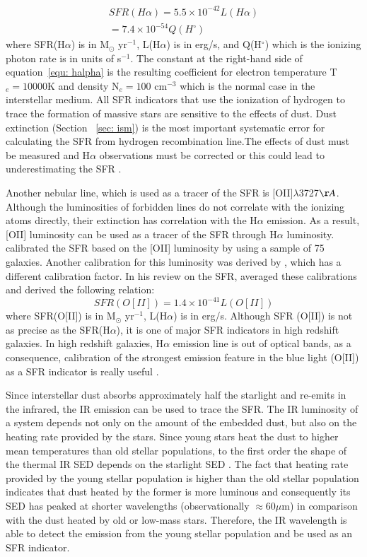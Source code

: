 \begin{align}
\label{equ: halpha}
SFR(H\alpha) = 5.5 \times 10^{-42}L(H\alpha) \\
                     = 7.4 \times 10^{-54}Q(H^{\circ})
\end{align}
where SFR(H$\alpha$) is in M$_{\odot}$ yr$^{-1}$, L(H$\alpha$) is in erg/s, and Q(H$^{\circ}$) which is the ionizing photon rate is in units of s$^{-1}$. The constant at the right-hand side of equation~\ref{equ: halpha} is the resulting coefficient for electron temperature T$_e=10000$K and density N$_e=100$ cm$^{-3}$ which is the normal case in the interstellar medium. All SFR indicators that use the ionization of hydrogen to trace the formation of massive stars are sensitive to the effects of dust. Dust extinction (Section ~\ref{sec: ism}) is the most important systematic error for calculating the SFR from hydrogen recombination line.The effects of dust must be measured and H$\alpha$ observations must be corrected or this could lead to underestimating the SFR \citep{Kennicutt98b}. 

Another nebular line, which is used as a tracer of the SFR is [OII]$\lambda$3727$\AA$. Although the luminosities of forbidden lines do not correlate with the ionizing atoms directly, their extinction has correlation with the H$\alpha$ emission. As a result, [OII] luminosity can be used as a tracer of the SFR through H$\alpha$ luminosity. \cite{Gallagher89} calibrated the SFR based on the [OII] luminosity by using a sample of 75 galaxies. Another calibration for this luminosity was derived by \cite{Kennicutt92}, which has a different calibration factor. In his review on the SFR, \citep{Kennicutt98b} averaged these calibrations and derived the following relation:
\begin{equation}
SFR(O[II]) = 1.4 \times 10^{-41} L(O[II])
\end{equation}  
where SFR(O[II]) is in M$_{\odot}$ yr$^{-1}$, L(H$\alpha$) is in erg/s. Although SFR (O[II]) is not as precise as the SFR(H$\alpha$), it is one of major SFR indicators in high redshift galaxies. In high redshift galaxies, H$\alpha$ emission line is out of optical bands, as a consequence, calibration of the strongest emission feature in the blue light (O[II]) as a SFR indicator is really useful \citep{Kennicutt98b}.


Since interstellar dust absorbs approximately half the starlight and re-emits in the infrared, the IR emission can be used to trace the SFR. The IR luminosity of a system depends not only on the amount of the embedded dust, but also on the heating rate provided by the stars. Since young stars heat the dust to higher mean temperatures than old stellar populations, to the first order the shape of the thermal IR SED depends on the starlight SED \citep{Helou86}. The fact that heating rate provided by the young stellar population is higher than the old stellar population indicates that dust heated by the former is more luminous and consequently its SED has peaked at shorter wavelengths (observationally $\approx 60  \mu$m) in comparison with the dust heated by old or low-mass stars.
Therefore, the IR wavelength is able to detect the emission from the young stellar population and be used as an SFR indicator.  

